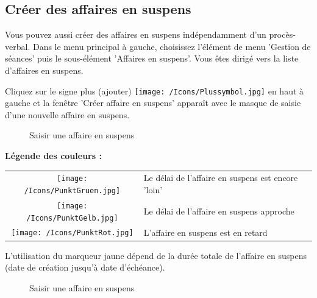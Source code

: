 \subsection{Créer des affaires en suspens}

Vous pouvez aussi créer des affaires en suspens indépendamment d'un procès-verbal. Dans le menu principal à gauche, choisissez l'élément de menu 'Gestion de séances' puis le sous-élément 'Affaires en suspens'. Vous êtes dirigé vers la liste d'affaires en suspens.

\vspace{\baselineskip}

Cliquez sur le signe plus (ajouter) \texttt{[image: /Icons/Plussymbol.jpg]}  en haut à gauche et la fenêtre 'Créer affaire en suspens' apparaît avec le masque de saisie d'une nouvelle affaire en suspens.

\begin{figure}[H]
\caption{Saisir une affaire en suspens}
\end{figure}

\textbf{Légende des couleurs :}

\begin{tabular}{c p{14cm} l} %
\texttt{[image: /Icons/PunktGruen.jpg]} & Le délai de l'affaire en suspens est encore 'loin' \\
\texttt{[image: /Icons/PunktGelb.jpg]} & Le délai de l'affaire en suspens approche \\
\texttt{[image: /Icons/PunktRot.jpg]} & L'affaire en suspens est en retard \\
\end{tabular}

\vspace{\baselineskip}

L'utilisation du marqueur jaune dépend de la durée totale de l'affaire en suspens (date de création jusqu'à date d'échéance).

\begin{figure}[H]
\caption{Saisir une affaire en suspens}
\end{figure}

